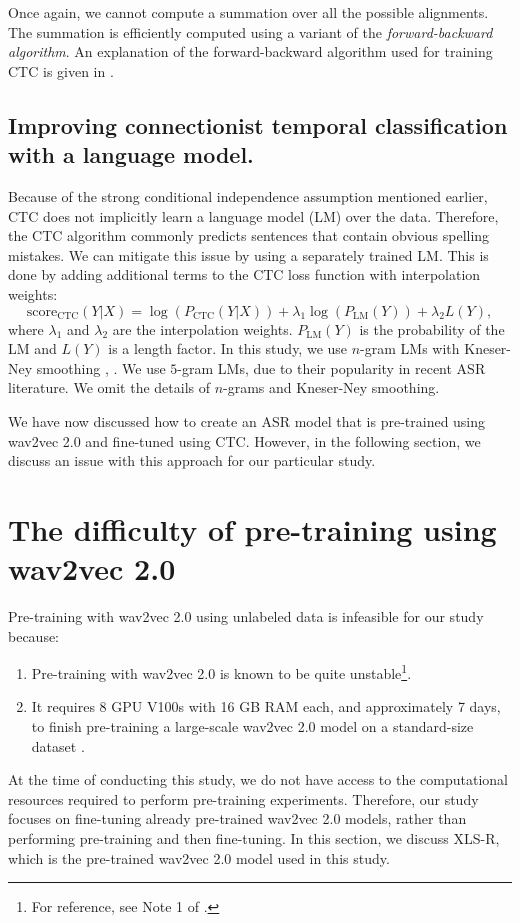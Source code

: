 Once again, we cannot compute a summation over all the possible alignments.
The summation is efficiently computed using a variant of the \emph{forward-backward algorithm}.
An explanation of the forward-backward algorithm used for training CTC is given in \cite{hannun2017sequence}.

\subsection{Improving connectionist temporal classification with a language model.} \label{subsec:lm-boost}
Because of the strong conditional independence assumption mentioned earlier,
CTC does not implicitly learn a language model (LM) over the data.
Therefore, the CTC algorithm commonly predicts sentences that contain obvious spelling mistakes.
We can mitigate this issue by using a separately trained LM.
This is done by adding additional terms to the CTC loss function with interpolation weights:
\begin{equation}
    \text{score}_{\text{CTC}}(Y|X) = \log\left(P_{\text{CTC}}(Y|X)\right) + \lambda_1 \log\left(P_{\text{LM}}(Y)\right) + \lambda_2 L(Y),
\end{equation}
where $\lambda_1$ and $\lambda_2$ are the interpolation weights. $P_{\text{LM}}(Y)$ is the probability of the LM and $L(Y)$ is a length factor.
In this study, we use $n$-gram LMs with Kneser-Ney smoothing \cite{shannon1948}, \cite{ney1994structuring}. 
We use $5$-gram LMs, due to their popularity in recent ASR literature.
We omit the details of $n$-grams and Kneser-Ney smoothing.

We have now discussed how to create an ASR model that is pre-trained using wav2vec 2.0 and fine-tuned using CTC. 
However, in the following section, we discuss an issue with this approach for our particular study.



\section{The difficulty of pre-training using wav2vec 2.0}\label{sec:gott}
Pre-training with wav2vec 2.0 using unlabeled data is infeasible for our study because:
\begin{enumerate}
    \item Pre-training with wav2vec 2.0 is known to be quite unstable\footnote{For reference, see Note 1 of \cite{vonplaten2021pretraining}.}.
    \item It requires 8 GPU V100s with 16 GB RAM each, and approximately 7 days, to finish pre-training a large-scale wav2vec 2.0 model on a standard-size dataset \cite{vonplaten2021pretraining}.
\end{enumerate}
At the time of conducting this study, we do not have access to the computational resources required to perform pre-training experiments.
Therefore, our study focuses on fine-tuning already pre-trained wav2vec 2.0 models, rather than performing pre-training and then fine-tuning.
In this section, we discuss XLS-R, which is the pre-trained wav2vec 2.0 model used in this study.

